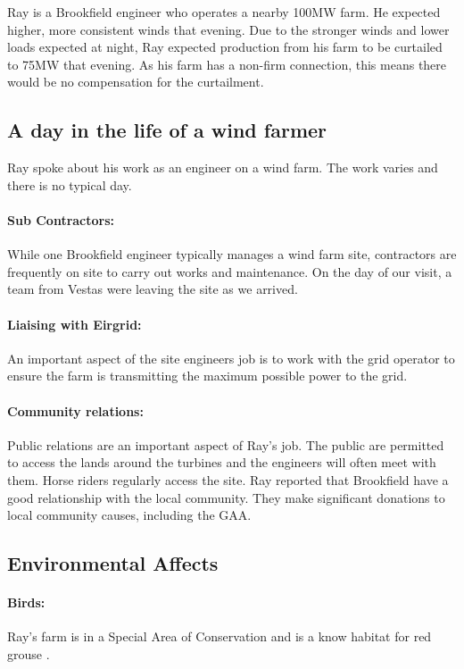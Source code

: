 \documentclass[12pt]{article} %
\begin{document}
Ray is a Brookfield engineer who operates a nearby 100MW farm.
He expected higher, more consistent winds that evening. Due to the stronger winds and lower loads expected at night, Ray expected production from his farm to be curtailed to 75MW that evening. As his farm has a non-firm connection, this means there would be no compensation for the curtailment.

\subsection{A day in the life of a wind farmer}
Ray spoke about his work as an engineer on a wind farm. The work varies and there is no typical day.

\paragraph{Sub Contractors:} While one Brookfield engineer typically manages a wind farm site, contractors are frequently on site to carry out works and maintenance. On the day of our visit, a team from Vestas were leaving the site as we arrived. 

\paragraph{Liaising with Eirgrid:} An important aspect of the site engineers job is to work with the grid operator to ensure the farm is transmitting the maximum possible power to the grid.

\paragraph{Community relations:} Public relations are an important aspect of Ray's job. The public are permitted to access the lands around the turbines and the engineers will often meet with them. Horse riders regularly access the site.
Ray reported that Brookfield have a good relationship with the local community. They make significant donations to local community causes, including the GAA.

\subsection{Environmental Affects}

\paragraph{Birds:} 
Ray's farm is in a Special Area of Conservation and is a know habitat for red grouse \cite{birds}.
\end{document}
